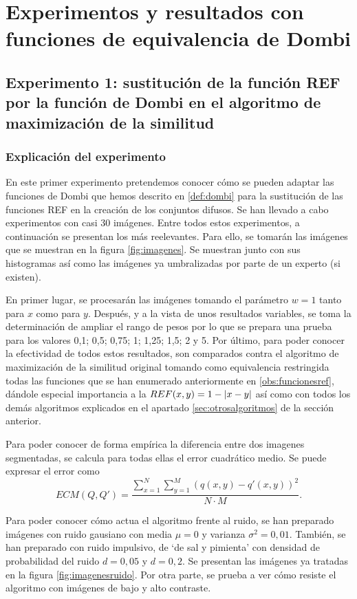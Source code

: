 \documentclass[main]{subfiles}
\begin{document}
\section{Experimentos y resultados con funciones de equivalencia de Dombi}\label{sec:resultadosmono}

\subsection{Experimento 1: sustitución de la función REF por la función de Dombi en el algoritmo de maximización de la similitud}
\subsubsection{Explicación del experimento}
En este primer experimento pretendemos conocer cómo se pueden adaptar las funciones de Dombi que hemos descrito en \ref{def:dombi} para la sustitución de las funciones REF en la creación de los conjuntos difusos. Se han llevado a cabo experimentos con casi 30 imágenes. Entre todos estos experimentos, a continuación se presentan los más reelevantes. Para ello, se tomarán las imágenes que se muestran en la figura \ref{fig:imagenes}. Se muestran junto con sus histogramas así como las imágenes ya umbralizadas por parte de un experto (si existen).

En primer lugar, se procesarán las imágenes tomando el parámetro $w=1$ tanto para $x$ como para $y$. Después, y a la vista de unos resultados variables, se toma la determinación de ampliar el rango de pesos por lo que se prepara una prueba para los valores 0,1; 0,5; 0,75; 1; 1,25; 1,5; 2 y 5. Por último, para poder conocer la efectividad de todos estos resultados, son comparados contra el algoritmo de maximización de la similitud original tomando como equivalencia restringida todas las funciones que se han enumerado anteriormente en \ref{obs:funcionesref}, dándole especial importancia a la \mbox{$REF(x,y)=1-\left\vert x-y\right\vert$} así como con todos los demás algoritmos explicados en el apartado \ref{sec:otrosalgoritmos} de la sección anterior.

Para poder conocer de forma empírica la diferencia entre dos imagenes segmentadas, se calcula para todas ellas el error cuadrático medio. Se puede expresar el error como
$$ECM(Q, Q') = \frac{\sum_{x=1}^N\sum_{y=1}^M \left(q(x,y)-q'(x,y)\right)^2}{N\cdot M}.$$

Para poder conocer cómo actua el algoritmo frente al ruido, se han preparado imágenes con ruido gausiano con media $\mu=0$ y varianza $\sigma^2 = 0,01$. También, se han preparado con ruido impulsivo, de `de sal y pimienta' con densidad de probabilidad del ruido $d=0,05$ y $d=0,2$. Se presentan las imágenes ya tratadas en la figura \ref{fig:imagenesruido}. Por otra parte, se prueba a ver cómo resiste el algoritmo con imágenes de bajo y alto contraste.
\end{document}
